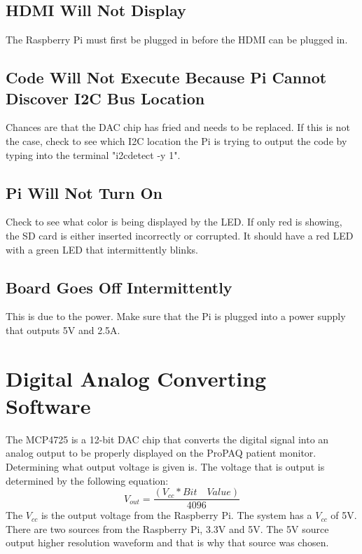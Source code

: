 \documentclass[12pt]{report}
\begin{document}
\subsection*{HDMI Will Not Display}
\newline The Raspberry Pi must first be plugged in before the HDMI can be plugged in. 

\subsection*{Code Will Not Execute Because Pi Cannot Discover I2C Bus Location}
\newline Chances are that the DAC chip has fried and needs to be replaced. If this is not the case, check to see which I2C location the Pi is trying to output the code by typing into the terminal "i2cdetect -y 1".

\subsection*{Pi Will Not Turn On}
\newline Check to see what color is being displayed by the LED. If only red is showing, the SD card is either inserted incorrectly or corrupted. It should have a red LED with a green LED that intermittently blinks. 
\subsection*{Board Goes Off Intermittently}
\newline This is due to the power. Make sure that the Pi is plugged into a power supply that outputs 5V and 2.5A.
\section*{Digital Analog Converting Software}
The MCP4725 is a 12-bit DAC chip that converts the digital signal into an analog output to be properly displayed on the ProPAQ patient monitor. Determining what output voltage is given is. The voltage that is output is determined by the following equation: 
\newline
$$V_{out} = \frac{(V_{cc} * Bit \quad Value)}{4096}$$
\newline
The $V_{cc}$ is the output voltage from the Raspberry Pi. The system has a $V_{cc}$ of 5V. There are two sources from the Raspberry Pi, 3.3V and 5V. The 5V source output higher resolution waveform and that is why that source was chosen. 
\end{document}
